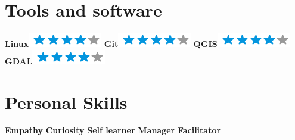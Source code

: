 \documentclass[]{friggeri-cv}
\begin{document}
\begin{aside}
  \section{Tools and software}
    \textbf{Linux}\includegraphics[scale=0.40]{img/4stars.png}
    \textbf{Git}\includegraphics[scale=0.40]{img/4stars.png}
    \textbf{QGIS}\includegraphics[scale=0.40]{img/4stars.png}
    \textbf{GDAL}\includegraphics[scale=0.40]{img/4stars.png}
    ~
  \section{Personal Skills}
    \textbf{Empathy}
    \textbf{Curiosity}
    \textbf{Self learner}
    \textbf{Manager}
    \textbf{Facilitator} 
    ~
\end{aside}

\end{document}
